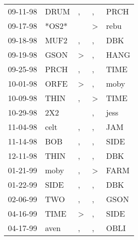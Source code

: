 \begin{supertabular}{p{0.07\textwidth}p{0.06\textwidth}p{0.02\textwidth}p{0.02\textwidth}p{0.06\textwidth}}
 09-11-98\textsuperscript{} &  DRUM\textsuperscript{} &                , &             , &  PRCH\textsuperscript{} \\
 09-17-98\textsuperscript{} &                   *OS2* &                  &  \textgreater &  rebu\textsuperscript{} \\
 09-18-98\textsuperscript{} &  MUF2\textsuperscript{} &                , &             , &   DBK\textsuperscript{} \\
 09-19-98\textsuperscript{} &  GSON\textsuperscript{} &     \textgreater &             , &  HANG\textsuperscript{} \\
 09-25-98\textsuperscript{} &  PRCH\textsuperscript{} &                , &             , &  TIME\textsuperscript{} \\
 10-01-98\textsuperscript{} &  ORFE\textsuperscript{} &     \textgreater &             , &  moby\textsuperscript{} \\
 10-09-98\textsuperscript{} &  THIN\textsuperscript{} &                , &  \textgreater &  TIME\textsuperscript{} \\
 10-29-98\textsuperscript{} &   2X2\textsuperscript{} &                  &             , &  jess\textsuperscript{} \\
 11-04-98\textsuperscript{} &  celt\textsuperscript{} &                , &             , &   JAM\textsuperscript{} \\
 11-14-98\textsuperscript{} &   BOB\textsuperscript{} &                , &             , &  SIDE\textsuperscript{} \\
 12-11-98\textsuperscript{} &  THIN\textsuperscript{} &                , &             , &   DBK\textsuperscript{} \\
 01-21-99\textsuperscript{} &  moby\textsuperscript{} &                , &  \textgreater &  FARM\textsuperscript{} \\
 01-22-99\textsuperscript{} &  SIDE\textsuperscript{} &                , &             , &   DBK\textsuperscript{} \\
 02-06-99\textsuperscript{} &   TWO\textsuperscript{} &                , &             , &  GSON\textsuperscript{} \\
 04-16-99\textsuperscript{} &  TIME\textsuperscript{} &     \textgreater &             , &  SIDE\textsuperscript{} \\
 04-17-99\textsuperscript{} &  aven\textsuperscript{} &                , &             , &  OBLI\textsuperscript{} \\

\end{supertabular}
